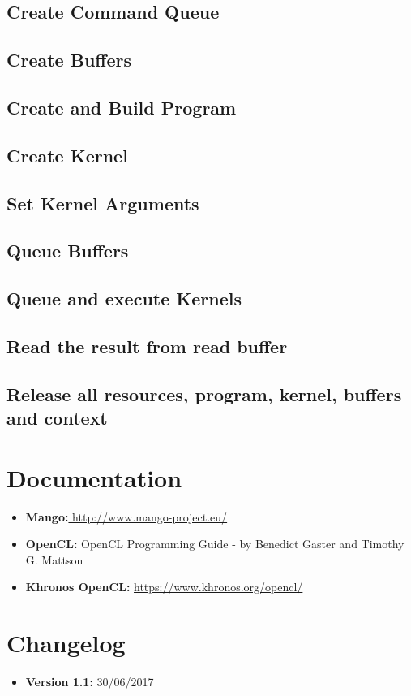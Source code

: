 \documentclass[a4paper]{article}
\begin{document}
\subsection{Create Command Queue}
\subsection{Create Buffers}
\subsection{Create and Build Program}
\subsection{Create Kernel}
\subsection{Set Kernel Arguments}
\subsection{Queue Buffers}
\subsection{Queue and execute Kernels}
\subsection{Read the result from read buffer}
\subsection{Release all resources, program, kernel, buffers and context}


\newpage
\section{Documentation}
\begin{itemize}
	\item \textbf{Mango:}\url{ http://www.mango-project.eu/}
	\item \textbf{OpenCL:} OpenCL Programming Guide - by Benedict Gaster and Timothy G. Mattson
	\item \textbf{Khronos OpenCL:} \url{https://www.khronos.org/opencl/}
\end{itemize}
\newpage


\section{Changelog}
\begin{itemize}
\item \textbf {Version 1.1:} 30/06/2017
\end{itemize}
\end{document}
